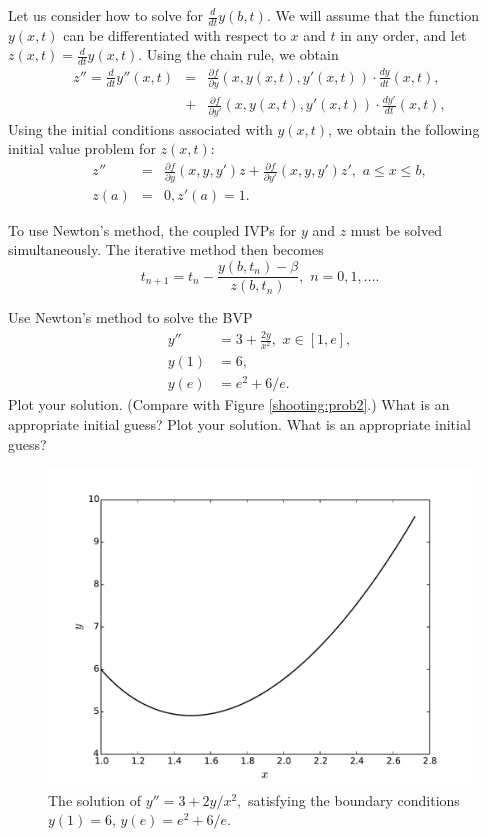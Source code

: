 Let us consider how to solve for $\frac{d}{dt} y(b,t)$. We will assume that the function $y(x,t)$ can be differentiated with respect to $x$ and $t$ in any order, and let  $z(x,t) = \frac{d}{dt} y(x,t).$ Using the chain rule, we obtain 
\begin{eqnarray*}
z'' = \frac{d}{dt} y''(x,t) &=& \frac{\partial f}{\partial y} (x,y(x,t),y'(x,t)) \cdot \frac{dy}{dt}(x,t) ,\\
&+& \frac{\partial f}{\partial y'} (x,y(x,t),y'(x,t)) \cdot \frac{dy'}{dt}(x,t),
\end{eqnarray*}
Using the initial conditions associated with $y(x,t)$, we obtain the following initial value problem for $z(x,t)$: 
\begin{eqnarray*}
z'' &=& \frac{\partial f}{\partial y} (x,y,y') z + \frac{\partial f}{\partial y'} (x,y,y') z'
,\,\,a \leq x \leq b, \\
 z(a) &=& 0, z'(a) = 1.
\end{eqnarray*}

To use Newton's method, the coupled IVPs for $y$ and $z$ must be solved simultaneously. The iterative method then becomes 
\[
t_{n+1} = t_n - \frac{ y(b,t_n) - \beta}{z(b,t_n)}, \,\, n = 0,1,\hdots
.\]


\begin{problem}
Use Newton's method to solve the BVP
\begin{equation*}
\begin{split}
y'' &= 3 + \frac{2y}{x^2}, \,\, x \in [1,e],\\
y(1) &= 6, \\
y(e) &= e^2 + 6/e.
\end{split}
\end{equation*}
Plot your solution. (Compare with Figure \eqref{shooting:prob2}.) What is an appropriate initial guess? 
Plot your solution. What is an appropriate initial guess?
\end{problem}


\begin{figure}[ht]
\centering
\includegraphics[width=\textwidth]{Fig2.pdf}
\caption{The solution of  $y'' = 3 + 2y/x^2,$ satisfying the boundary conditions $y(1) = 6$, $ y(e) =  e^2 + 6/e$.}
\label{shooting:prob2}
\end{figure}

